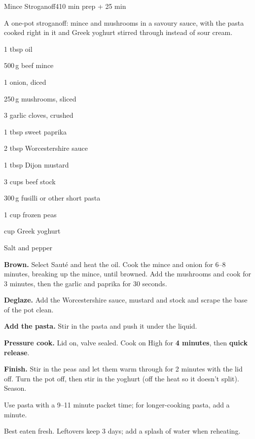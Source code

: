 \begin{recipebox}{Mince Stroganoff}{4}{10 min prep + 25 min}

A one-pot stroganoff: mince and mushrooms in a savoury sauce, with the pasta
cooked right in it and Greek yoghurt stirred through instead of sour cream.

\begin{ingredients}
  \item 1 tbsp oil
  \item 500\,g beef mince
  \item 1 onion, diced
  \item 250\,g mushrooms, sliced
  \item 3 garlic cloves, crushed
  \item 1 tbsp sweet paprika
  \item 2 tbsp Worcestershire sauce
  \item 1 tbsp Dijon mustard
  \item 3 cups beef stock
  \item 300\,g fusilli or other short pasta
  \item 1 cup frozen peas
  \item {} cup Greek yoghurt
  \item Salt and pepper
\end{ingredients}

\begin{method}
  \item \textbf{Brown.} Select Saut\'e and heat the oil. Cook the mince and onion for
        6--8 minutes, breaking up the mince, until browned. Add the mushrooms and
        cook for 3 minutes, then the garlic and paprika for 30 seconds.
  \item \textbf{Deglaze.} Add the Worcestershire sauce, mustard and stock and scrape
        the base of the pot clean.
  \item \textbf{Add the pasta.} Stir in the pasta and push it under the liquid.
  \item \textbf{Pressure cook.} Lid on, valve sealed. Cook on High for
        \textbf{4 minutes}, then \textbf{quick release}.
  \item \textbf{Finish.} Stir in the peas and let them warm through for 2 minutes
        with the lid off. Turn the pot off, then stir in the yoghurt (off the heat
        so it doesn't split). Season.
\end{method}

\begin{notelist}
  \item Use pasta with a 9--11 minute packet time; for longer-cooking pasta, add a
        minute.
  \item Best eaten fresh. Leftovers keep 3 days; add a splash of water when reheating.
\end{notelist}

\end{recipebox}
